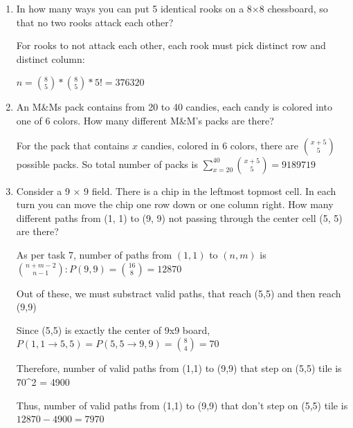 \documentclass[12pt]{article}
\begin{document}
\begin{enumerate}
So number of paths from $(1,1)$ to $(n,m)$ is $\binom{n+m-2}{n-1}$



\item In how many ways you can put 5 identical rooks on a 8×8 chessboard, so that
no two rooks attack each other?

For rooks to not attack each other, each rook must pick distinct row and distinct column:

$n = \binom{8}{5} * \binom{8}{5} * 5! = 376320$


\item An M&Ms pack contains from 20 to 40 candies, each candy is colored into one of 6 colors. How many different M&M’s packs are there?

For the pack that contains $x$ candies, colored in 6 colors, there are $\binom{x+5}{5}$ possible packs.
So total number of packs is $\sum_{x=20}^{40}\binom{x+5}{5} = 9189719$

\item Consider a 9 × 9 field. There is a chip in the leftmost topmost cell. In each
turn you can move the chip one row down or one column right. How many
different paths from (1, 1) to (9, 9) not passing through the center cell (5, 5) are
there?


As per task 7, number of paths from $(1,1)$ to $(n,m)$ is $\binom{n+m-2}{n-1}: P(9,9) = \binom{16}{8} = 12870$

Out of these, we must substract valid paths, that reach (5,5) and then reach (9,9)

Since (5,5) is exactly the center of 9x9 board, $P(1,1 \rightarrow 5,5) = P(5,5 \rightarrow 9,9) = \binom{8}{4} = 70$

Therefore, number of valid paths from (1,1) to (9,9) that step on (5,5) tile is 70^2 = 4900

Thus, number of valid paths from (1,1) to (9,9) that don't step on (5,5) tile is $12870 - 4900 = 7970$ 



\end{enumerate}
\end{document}
